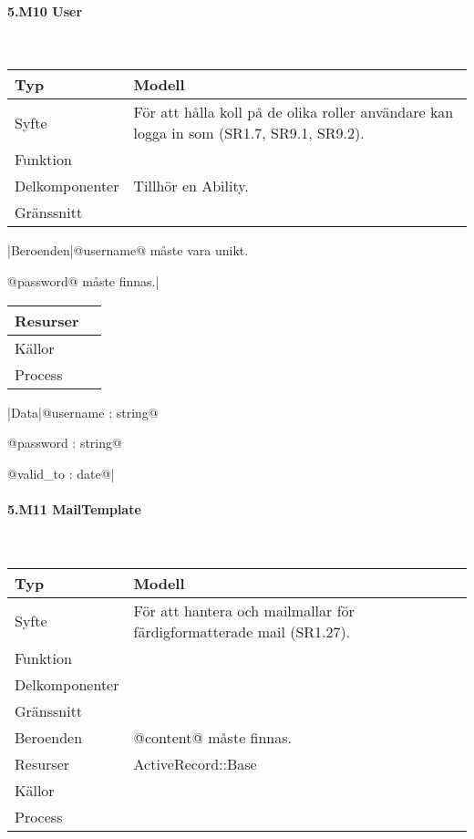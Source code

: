 \documentclass[a4paper, twoside, 11pt, titlepage]{article}
\begin{document}
			\paragraph{5.M10 User}\

			\begin {table} [ht] \begin{tabular} {  p{3.5cm} p{9.6cm} }
				\hline
				Typ & Modell  \\
				\hline
				Syfte & För att hålla koll på de olika roller användare kan logga in som (SR1.7, SR9.1, SR9.2).  \\
				\hline
				Funktion &   \\
				\hline
				Delkomponenter & Tillhör en Ability.  \\
				\hline
				Gränssnitt &   \\
				\hline
			\end{tabular} \end{table} \FloatBarrier
			\vspace{6mm}

			|Beroenden|@username@ måste vara unikt.

			@password@ måste finnas.|

			\begin {table} [ht] \begin{tabular} {  p{3.5cm} p{9.6cm} }
				\hline
				Resurser &   \\
				\hline
				Källor &   \\
				\hline
				Process &   \\
				\hline
			\end{tabular} \end{table} \FloatBarrier
			\vspace{6mm}

			|Data|@username : string@

			@password : string@

			@valid\_to : date@|

			\paragraph{5.M11 MailTemplate}\

			\begin {table} [ht] \begin{tabular} {  p{3.5cm} p{9.6cm} }
				\hline
				Typ & Modell  \\
				\hline
				Syfte & För att hantera och mailmallar för färdigformatterade mail (SR1.27).  \\
				\hline
				Funktion &   \\
				\hline
				Delkomponenter &   \\
				\hline
				Gränssnitt &   \\
				\hline
				Beroenden & @content@ måste finnas.  \\
				\hline
				Resurser & ActiveRecord::Base  \\
				\hline
				Källor &   \\
				\hline
				Process &   \\
				\hline
			\end{tabular} \end{table} \FloatBarrier
			\vspace{6mm}
\end{document}
